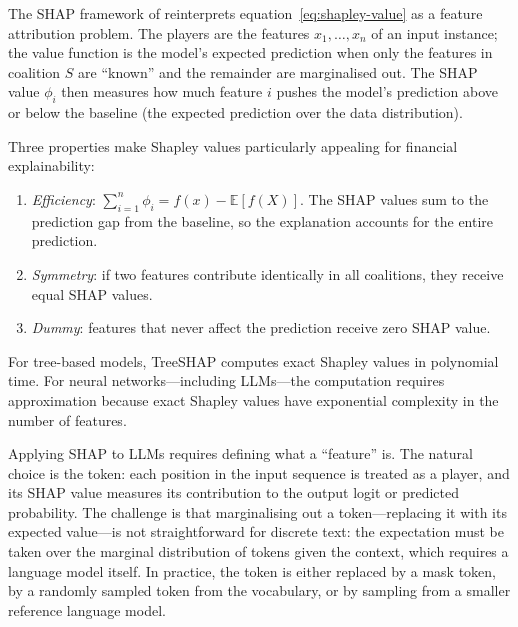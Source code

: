 The SHAP framework of \citet{lundberg2017unified} reinterprets equation~\eqref{eq:shapley-value}
as a feature attribution problem. The players are the features $x_1, \ldots, x_n$ of an
input instance; the value function is the model's expected prediction when only the
features in coalition $S$ are ``known'' and the remainder are marginalised out. The SHAP
value $\phi_i$ then measures how much feature $i$ pushes the model's prediction above
or below the baseline (the expected prediction over the data distribution).

Three properties make Shapley values particularly appealing for financial explainability:

\begin{enumerate}
  \item \emph{Efficiency}: $\sum_{i=1}^n \phi_i = f(x) - \mathbb{E}[f(X)]$. The SHAP
        values sum to the prediction gap from the baseline, so the explanation accounts
        for the entire prediction.
  \item \emph{Symmetry}: if two features contribute identically in all coalitions, they
        receive equal SHAP values.
  \item \emph{Dummy}: features that never affect the prediction receive zero SHAP value.
\end{enumerate}

For tree-based models, TreeSHAP \cite{lundberg2020local} computes exact Shapley values
in polynomial time. For neural networks---including LLMs---the computation requires
approximation because exact Shapley values have exponential complexity in the number of
features.

Applying SHAP to LLMs requires defining what a ``feature'' is. The natural choice is the
token: each position in the input sequence is treated as a player, and its SHAP value
measures its contribution to the output logit or predicted probability. The challenge is
that marginalising out a token---replacing it with its expected value---is not
straightforward for discrete text: the expectation must be taken over the marginal
distribution of tokens given the context, which requires a language model itself. In
practice, the token is either replaced by a mask token, by a randomly sampled token from
the vocabulary, or by sampling from a smaller reference language model.

